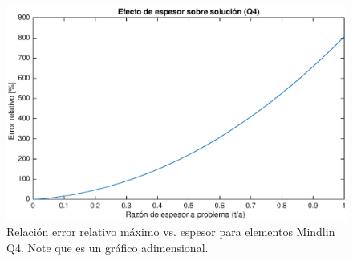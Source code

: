 \documentclass[onecolumn,10pt,titlepage]{article}
\begin{document}
\begin{figure}[htb!]
	\centering
	\includegraphics[width=.9\textwidth]{fig/espesor.eps}
	\caption{Relación error relativo máximo vs. espesor para elementos Mindlin Q4. Note que es un gráfico adimensional.}
	\label{fig:espesorplacas}
\end{figure}
\end{document}
